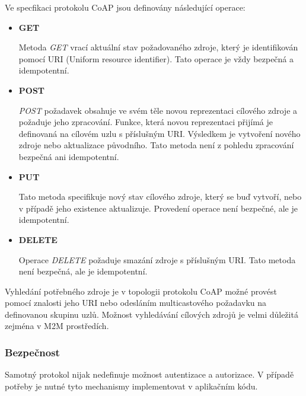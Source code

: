    Ve specfikaci protokolu CoAP jsou definovány následující operace:
   \begin{itemize}
    \item \textbf{GET}
    
    Metoda \textit{GET} vrací aktuální stav požadovaného zdroje, který je identifikován pomocí
    URI (Uniform resource identifier). Tato operace je vždy bezpečná a idempotentní.
    
    \item \textbf{POST}
    
    \textit{POST} požadavek obsahuje ve svém těle novou reprezentaci cílového zdroje a požaduje 
    jeho zpracování. Funkce, která
    novou reprezentaci přijímá je definovaná na cílovém uzlu s příslušným URI.
    Výsledkem je vytvoření nového zdroje nebo aktualizace původního. Tato metoda
    není z pohledu zpracování bezpečná ani idempotentní.
    
    \item \textbf{PUT}
    
    Tato metoda specifikuje nový stav cílového zdroje, který se buď vytvoří, nebo 
    v případě jeho existence aktualizuje. Provedení operace není bezpečné, ale 
    je idempotentní.
    
    \item \textbf{DELETE}
    
    Operace \textit{DELETE} požaduje smazání zdroje s příslušným URI. Tato metoda není bezpečná,
    ale je idempotentní.
    
   \end{itemize}
   
   Vyhledání potřebného zdroje je v topologii protokolu CoAP možné provést pomocí
   znalosti jeho URI nebo odesláním multicastového požadavku na definovanou
   skupinu uzlů. Možnost vyhledávání cílových zdrojů je velmi důležitá zejména
   v M2M prostředích. \cite{coap}
   
   \subsubsection{Bezpečnost}
   Samotný protokol nijak nedefinuje možnost autentizace a autorizace. V případě
   potřeby je nutné tyto mechanismy implementovat v aplikačním kódu. 
   
